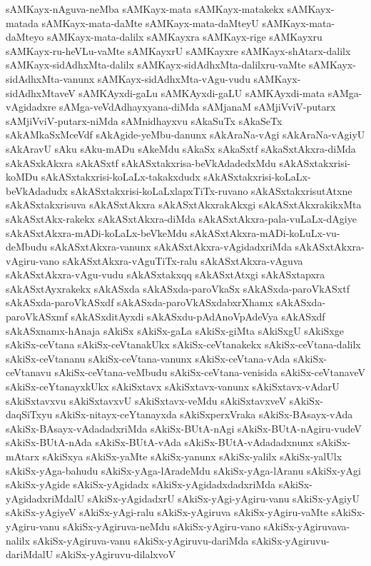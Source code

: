 {sAMKayx-nAguva-neMba
sAMKayx-mata
sAMKayx-matakekx
sAMKayx-matada
sAMKayx-mata-daMte
sAMKayx-mata-daMteyU
sAMKayx-mata-daMteyo
sAMKayx-mata-dalilx
sAMKayxra
sAMKayx-rige
sAMKayxru
sAMKayx-ru-heVLu-vaMte
sAMKayxrU
sAMKayxre
sAMKayx-shAtarx-dalilx
sAMKayx-sidAdhxMta-dalilx
sAMKayx-sidAdhxMta-dalilxru-vaMte
sAMKayx-sidAdhxMta-vanunx
sAMKayx-sidAdhxMta-vAgu-vudu
sAMKayx-sidAdhxMtaveV
sAMKAyxdi-gaLu
sAMKAyxdi-gaLU
sAMKAyxdi-mata
sAMga-vAgidadxre
sAMga-veVdAdhayxyana-diMda
sAMjanaM
sAMjiVviV-putarx
sAMjiVviV-putarx-niMda
sAMnidhayxvu
sAkaSuTx
sAkaSeTx
sAkAMkaSxMceVdf
sAkAgide-yeMbu-danunx
sAkAraNa-vAgi
sAkAraNa-vAgiyU
sAkAravU
sAku
sAku-mADu
sAkeMdu
sAkaSx
sAkaSxtf
sAkaSxtAkxra-diMda
sAkASxkAkxra
sAkASxtf
sAkASxtakxrisa-beVkAdadedxMdu
sAkASxtakxrisi-koMDu
sAkASxtakxrisi-koLaLx-takakxdudx
sAkASxtakxrisi-koLaLx-beVkAdadudx
sAkASxtakxrisi-koLaLxlapxTiTx-ruvano
sAkASxtakxrisutAtxne
sAkASxtakxrisuva
sAkASxtAkxra
sAkASxtAkxrakAkxgi
sAkASxtAkxrakikxMta
sAkASxtAkx-rakekx
sAkASxtAkxra-diMda
sAkASxtAkxra-pala-vuLaLx-dAgiye
sAkASxtAkxra-mADi-koLaLx-beVkeMdu
sAkASxtAkxra-mADi-koLuLx-vu-deMbudu
sAkASxtAkxra-vanunx
sAkASxtAkxra-vAgidadxriMda
sAkASxtAkxra-vAgiru-vano
sAkASxtAkxra-vAguTiTx-ralu
sAkASxtAkxra-vAguva
sAkASxtAkxra-vAgu-vudu
sAkASxtakxqq
sAkASxtAtxgi
sAkASxtapxra
sAkASxtAyxrakekx
sAkASxda
sAkASxda-paroVkaSx
sAkASxda-paroVkASxtf
sAkASxda-paroVkASxdf
sAkASxda-paroVkASxdabxrXhamx
sAkASxda-paroVkASxmf
sAkASxditAyxdi
sAkASxdu-pAdAnoVpAdeVya
sAkASxdf
sAkASxnamx-hAnaja
sAkiSx
sAkiSx-gaLa
sAkiSx-giMta
sAkiSxgU
sAkiSxge
sAkiSx-ceVtana
sAkiSx-ceVtanakUkx
sAkiSx-ceVtanakekx
sAkiSx-ceVtana-dalilx
sAkiSx-ceVtananu
sAkiSx-ceVtana-vanunx
sAkiSx-ceVtana-vAda
sAkiSx-ceVtanavu
sAkiSx-ceVtana-veMbudu
sAkiSx-ceVtana-venisida
sAkiSx-ceVtanaveV
sAkiSx-ceYtanayxkUkx
sAkiSxtavx
sAkiSxtavx-vanunx
sAkiSxtavx-vAdarU
sAkiSxtavxvu
sAkiSxtavxvU
sAkiSxtavx-veMdu
sAkiSxtavxveV
sAkiSx-daqSiTxyu
sAkiSx-nitayx-ceYtanayxda
sAkiSxperxVraka
sAkiSx-BAsayx-vAda
sAkiSx-BAsayx-vAdadadxriMda
sAkiSx-BUtA-nAgi
sAkiSx-BUtA-nAgiru-vudeV
sAkiSx-BUtA-nAda
sAkiSx-BUtA-vAda
sAkiSx-BUtA-vAdadadxnunx
sAkiSx-mAtarx
sAkiSxya
sAkiSx-yaMte
sAkiSx-yanunx
sAkiSx-yalilx
sAkiSx-yalUlx
sAkiSx-yAga-bahudu
sAkiSx-yAga-lAradeMdu
sAkiSx-yAga-lAranu
sAkiSx-yAgi
sAkiSx-yAgide
sAkiSx-yAgidadx
sAkiSx-yAgidadxdadxriMda
sAkiSx-yAgidadxriMdalU
sAkiSx-yAgidadxrU
sAkiSx-yAgi-yAgiru-vanu
sAkiSx-yAgiyU
sAkiSx-yAgiyeV
sAkiSx-yAgi-ralu
sAkiSx-yAgiruva
sAkiSx-yAgiru-vaMte
sAkiSx-yAgiru-vanu
sAkiSx-yAgiruva-neMdu
sAkiSx-yAgiru-vano
sAkiSx-yAgiruvava-nalilx
sAkiSx-yAgiruva-vanu
sAkiSx-yAgiruvu-dariMda
sAkiSx-yAgiruvu-dariMdalU
sAkiSx-yAgiruvu-dilalxvoV
}
